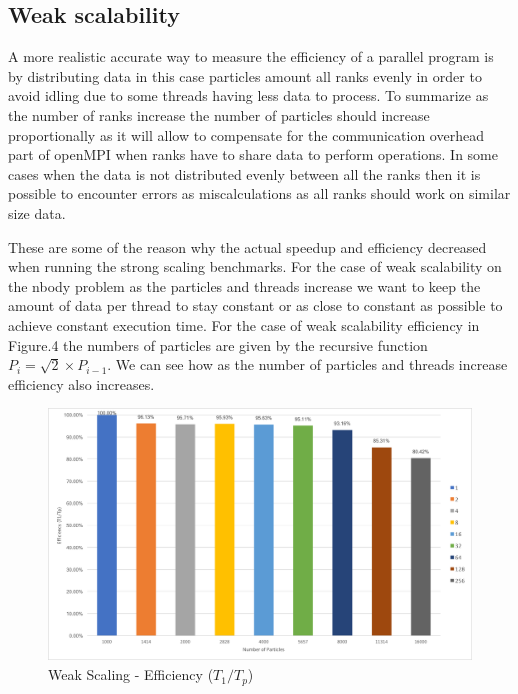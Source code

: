 \documentclass[12pt]{article} %
\begin{document}
\newpage

\subsection{Weak scalability}

A more realistic accurate way to measure the efficiency of a parallel program is by distributing data in this case particles amount all ranks evenly in order to avoid idling due to some threads having less data to process. To summarize as the number of ranks increase the number of particles should increase proportionally as it will allow to compensate for the communication overhead part of openMPI when ranks have to share data to perform operations. In some cases when the data is not distributed evenly between all the ranks then it is possible to encounter errors as miscalculations as all ranks should work on similar size data. 

These are some of the reason why the actual speedup and efficiency decreased when running the strong scaling benchmarks. For the case of weak scalability on the nbody problem as the particles and threads increase we want to keep the amount of data per thread to stay constant or as close to constant as possible to achieve constant execution time. For the case of weak scalability efficiency in Figure.4 the numbers of particles are given by the recursive function $ P_i = \sqrt{2} \times P_{i-1} $. We can see how as the number of particles and threads increase efficiency also increases.

\begin{figure}[htb]
\caption{Weak Scaling - Efficiency ($T_1/T_p$)}\label{fig:benchmark02}
\centering
\includegraphics[width=\textwidth,keepaspectratio]{imgs/img03.png}
\end{figure}
\end{document}
